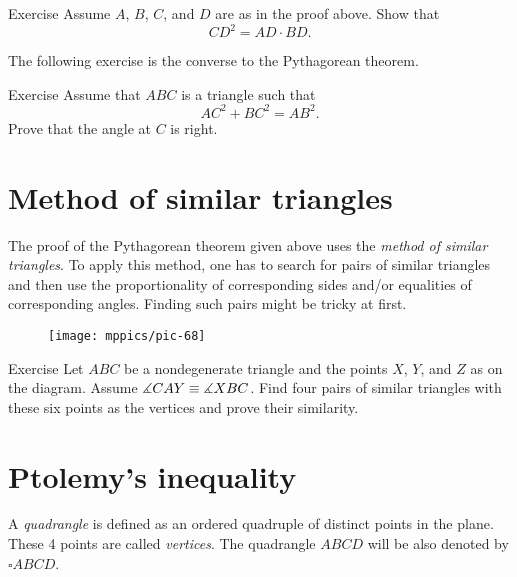 \begin{thm}{Exercise}\label{ex:pyth}
Assume $A$, $B$, $C$, and $D$ are as in the proof above.
Show that 
$$CD^2=AD\cdot BD.$$

\end{thm}

The following exercise is the converse to the Pythagorean theorem.

\begin{thm}{Exercise}\label{ex:pyth-conv}
Assume that $ABC$ is a triangle such that
$$AC^2+BC^2=AB^2.$$ 
Prove that the angle at $C$ is right.
\end{thm}


\section*{Method of similar triangles}

The proof of the Pythagorean theorem given above uses the \emph{method of similar triangles}.
To apply this method, one has to search for pairs of similar triangles and then use the proportionality of corresponding sides and/or equalities of corresponding angles.
Finding such pairs might be tricky at first. 

{

\begin{wrapfigure}{r}{25mm}
\vskip-6mm
\centering
\texttt{[image: mppics/pic-68]}
\end{wrapfigure}


\begin{thm}{Exercise}\label{ex:two-pairs-sim}
Let $ABC$ be a nondegenerate triangle and the points $X$, $Y$, and $Z$ as on the diagram.
Assume $\measuredangle CAY\z\equiv\measuredangle XBC$.
Find four pairs of similar triangles with these six points as the vertices
and prove their similarity.
\end{thm}

}

\section*{Ptolemy's inequality}

A \emph{quadrangle} is defined as an ordered quadruple of distinct points in the plane.
These 4 points are called \emph{vertices}.
The quadrangle $ABCD$ will be also denoted by $\square ABCD$.

